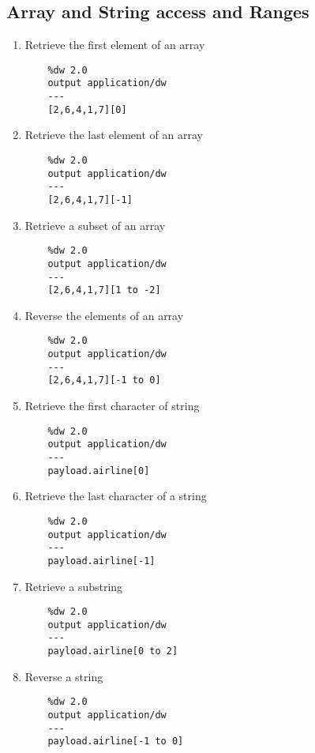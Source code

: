 \subsection{Array and String access and Ranges}
\begin{enumerate}[resume*]
\item Retrieve the first element of an array
  \begin{lstlisting}
    %dw 2.0
    output application/dw
    ---
    [2,6,4,1,7][0]
  \end{lstlisting}
\item Retrieve the last element of an array
  \begin{lstlisting}
    %dw 2.0
    output application/dw
    ---
    [2,6,4,1,7][-1]
  \end{lstlisting}
\item Retrieve a subset of an array
  \begin{lstlisting}
    %dw 2.0
    output application/dw
    ---
    [2,6,4,1,7][1 to -2]    
  \end{lstlisting}
\item Reverse the elements of an array
  \begin{lstlisting}
    %dw 2.0
    output application/dw
    ---
    [2,6,4,1,7][-1 to 0]
  \end{lstlisting}
\item Retrieve the first character of string
  \begin{lstlisting}
    %dw 2.0
    output application/dw
    ---
    payload.airline[0]
  \end{lstlisting}
\item Retrieve the last character of a string
  \begin{lstlisting}
    %dw 2.0
    output application/dw
    ---
    payload.airline[-1]
  \end{lstlisting}
\item Retrieve a substring
  \begin{lstlisting}
    %dw 2.0
    output application/dw
    ---
    payload.airline[0 to 2]
  \end{lstlisting}
\item Reverse a string
  \begin{lstlisting}
    %dw 2.0
    output application/dw
    ---
    payload.airline[-1 to 0]
  \end{lstlisting}
\end{enumerate}

